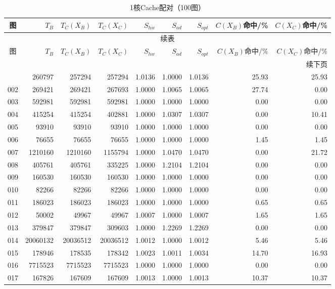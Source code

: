 \begin{longtable}{crrrrrrrr}
\caption{1核Cache配对（100图）}\label{tab:cache-detail-1}\\
\toprule
图 & $T_B$ & $T_C(X_B)$ & $T_C(X_C)$ & $S_{hw}$ & $S_{ad}$ & $S_{opt}$ & $C(X_B)$命中/\% & $C(X_C)$命中/\% \\
\midrule
\endfirsthead
\multicolumn{9}{c}{续表}\\
\toprule
图 & $T_B$ & $T_C(X_B)$ & $T_C(X_C)$ & $S_{hw}$ & $S_{ad}$ & $S_{opt}$ & $C(X_B)$命中/\% & $C(X_C)$命中/\% \\
\midrule
\endhead
\midrule\multicolumn{9}{r}{续下页}\\
\endfoot
\bottomrule
\endlastfoot
001 & 260797 & 257294 & 257294 & 1.0136 & 1.0000 & 1.0136 & 25.93 & 25.93 \\
002 & 269421 & 269421 & 267693 & 1.0000 & 1.0065 & 1.0065 & 27.74 & 0.00 \\
003 & 592981 & 592981 & 592981 & 1.0000 & 1.0000 & 1.0000 & 0.00 & 0.00 \\
004 & 415254 & 415254 & 402881 & 1.0000 & 1.0307 & 1.0307 & 0.00 & 10.41 \\
005 & 93910 & 93910 & 93910 & 1.0000 & 1.0000 & 1.0000 & 0.00 & 0.00 \\
006 & 76655 & 76655 & 76655 & 1.0000 & 1.0000 & 1.0000 & 1.45 & 1.45 \\
007 & 1210160 & 1210160 & 1155794 & 1.0000 & 1.0470 & 1.0470 & 0.00 & 21.72 \\
008 & 405761 & 405761 & 335225 & 1.0000 & 1.2104 & 1.2104 & 0.00 & 0.00 \\
009 & 160530 & 160530 & 160530 & 1.0000 & 1.0000 & 1.0000 & 0.00 & 0.00 \\
010 & 82266 & 82266 & 82266 & 1.0000 & 1.0000 & 1.0000 & 0.00 & 0.00 \\
011 & 186023 & 186023 & 186023 & 1.0000 & 1.0000 & 1.0000 & 0.65 & 0.65 \\
012 & 50002 & 49967 & 49967 & 1.0007 & 1.0000 & 1.0007 & 1.65 & 1.65 \\
013 & 379847 & 379847 & 309603 & 1.0000 & 1.2269 & 1.2269 & 0.00 & 0.00 \\
014 & 20060132 & 20036512 & 20036512 & 1.0012 & 1.0000 & 1.0012 & 5.46 & 5.46 \\
015 & 178946 & 178535 & 178342 & 1.0023 & 1.0011 & 1.0034 & 14.70 & 16.93 \\
016 & 7715523 & 7715523 & 7715523 & 1.0000 & 1.0000 & 1.0000 & 0.00 & 0.00 \\
017 & 167826 & 167609 & 167609 & 1.0013 & 1.0000 & 1.0013 & 10.37 & 10.37 \\

\end{longtable}
